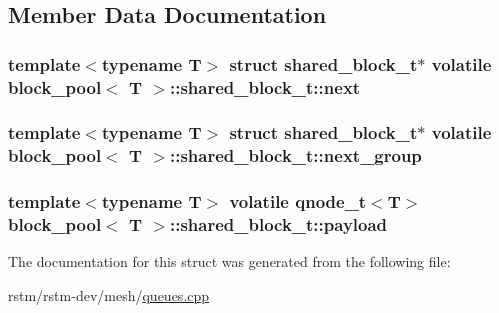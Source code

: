 \subsection{Member Data Documentation}
\hypertarget{structblock__pool_1_1shared__block__t_a84b5be10002aa5754c310fa94ba78b0d}{
\subsubsection[{next}]{\setlength{\rightskip}{0pt plus 5cm}template$<$typename T$>$ struct {\bf shared\-\_\-block\-\_\-t}$\ast$ volatile {\bf block\-\_\-pool}$<$ T $>$\-::shared\-\_\-block\-\_\-t\-::next}}\label{structblock__pool_1_1shared__block__t_a84b5be10002aa5754c310fa94ba78b0d}
\hypertarget{structblock__pool_1_1shared__block__t_adfa175667fb6e70b9894a3a6977feeda}{
\subsubsection[{next\-\_\-group}]{\setlength{\rightskip}{0pt plus 5cm}template$<$typename T$>$ struct {\bf shared\-\_\-block\-\_\-t}$\ast$ volatile {\bf block\-\_\-pool}$<$ T $>$\-::shared\-\_\-block\-\_\-t\-::next\-\_\-group}}\label{structblock__pool_1_1shared__block__t_adfa175667fb6e70b9894a3a6977feeda}
\hypertarget{structblock__pool_1_1shared__block__t_a88fd202f24790923340bd33d7ab690db}{
\subsubsection[{payload}]{\setlength{\rightskip}{0pt plus 5cm}template$<$typename T$>$ volatile {\bf qnode\-\_\-t}$<$T$>$ {\bf block\-\_\-pool}$<$ T $>$\-::shared\-\_\-block\-\_\-t\-::payload}}\label{structblock__pool_1_1shared__block__t_a88fd202f24790923340bd33d7ab690db}


The documentation for this struct was generated from the following file\-:\begin{DoxyCompactItemize}
\item 
rstm/rstm-\/dev/mesh/\hyperlink{queues_8cpp}{queues.\-cpp}\end{DoxyCompactItemize}
